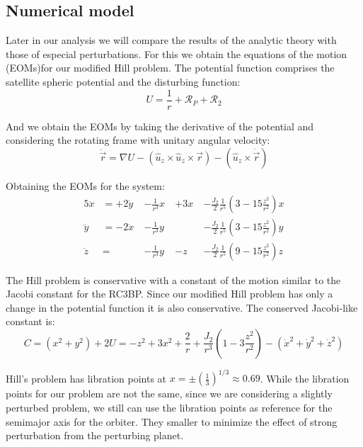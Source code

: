 \subsection{Numerical model}
Later in our analysis we will compare the results of the analytic theory with those of especial perturbations. For this we obtain the equations of the motion (EOMs)for our modified Hill problem. The potential function comprises the satellite spheric potential and the disturbing function:
\begin{equation}
U = \frac{1}{r} + \mathcal{R}_P + \mathcal{R}_2
\end{equation}

And we obtain the EOMs by taking the derivative of the potential and considering the rotating frame with unitary angular velocity:
\begin{equation}
\ddot{\vec{r}} = \nabla U  - \left(\hat{u}_z \times \hat{u}_z \times \vec{r}\right) - \left(\hat{u}_z \times \dot{\vec{r}}\right)
\end{equation}

Obtaining the EOMs for the system:
\begin{alignat}{5}
\label{eomX}
\ddot{x} &= +2 \dot{y} \	&-\frac{1}{r^3} x \	&+ 3x \	&- \frac{J_2 }{2} \frac{1}{r^5} \left(3 - 15 \frac{z^2}{r^2}\right) x\\
\label{eomY}
\ddot{y} &= -2 \dot{x} \	&-\frac{1}{r^3} y \	& 		&- \frac{J_2 }{2} \frac{1}{r^5} \left(3 - 15 \frac{z^2}{r^2}\right) y\\
\label{eomZ}
\ddot{z} &= 				&-\frac{1}{r^3} y \	&- z \	&- \frac{J_2 }{2} \frac{1}{r^5} \left(9 - 15 \frac{z^2}{r^2}\right) z
\end{alignat}

The Hill problem is conservative with a constant of the motion similar to the Jacobi constant for the RC3BP. Since our modified Hill problem has only a change in the potential function it is also conservative. The conserved Jacobi-like constant is:
\begin{equation}
C = (x^2 + y^2) + 2U = -z^2+ 3 x^2 + \frac{2}{r} + \frac{J_2}{r^3} \left(1 - 3 \frac{z^2}{r^2}\right) - (\dot{x}^2 + \dot{y}^2 + \dot{z}^2)
\end{equation}

Hill's problem has libration points at $x= \pm \left(\frac{1}{3}\right)^{1/3} \approx 0.69$. While the libration points for our problem are not the same, since we are considering a slightly perturbed problem, we still can use the libration points as reference for the semimajor axis for the orbiter. They smaller to minimize the effect of strong perturbation from the perturbing planet.